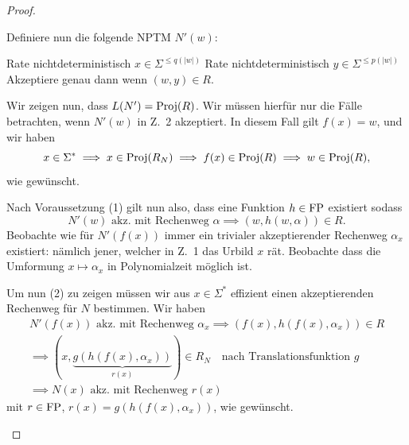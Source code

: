 \begin{proof}
\begin{prooflist}[label={}]
    Definiere nun die folgende NPTM $N'(w)$:\\
    \begin{algorithm}[H]
        Rate nichtdeterministisch $x\in \Sigma^{\leq q(|w|)}$\;
        Rate nichtdeterministisch $y\in \Sigma^{\leq p(|w|)}$\;
        Akzeptiere genau dann wenn $(w,y)\in R$.
    \end{algorithm}
    Wir zeigen nun, dass $L(N')=\operatorname{Proj}(R)$. Wir müssen hierfür nur die Fälle betrachten, wenn $N'(w)$ in Z.~2 akzeptiert.
    In diesem Fall gilt $f(x)=w$, und wir haben
    \[ x\in\Sigma^* \implies x\in\operatorname{Proj}(R_N) \implies f(x)\in\operatorname{Proj}(R) \implies w\in\operatorname{Proj}(R), \]
    wie gewünscht.

    Nach Voraussetzung (1) gilt nun also, dass eine Funktion $h\in\mathrm{FP}$ existiert sodass
    \[ N'(w) \text{ akz. mit Rechenweg $\alpha$} \implies (w,h(w,\alpha))\in R. \]
    Beobachte wie für $N'(f(x))$ immer ein trivialer akzeptierender Rechenweg $\alpha_x$ existiert: nämlich jener, welcher in Z.~1 das Urbild $x$ rät. Beobachte dass die Umformung $x\mapsto \alpha_x$ in Polynomialzeit möglich ist.

    Um nun (2) zu zeigen müssen wir aus $x\in\Sigma^*$ effizient einen akzeptierenden Rechenweg für $N$ bestimmen.
    Wir haben
    \begin{gather*}
        N'(f(x)) \text{ akz. mit Rechenweg $\alpha_x$} \implies (f(x),h(f(x),\alpha_x))\in R\\
        \implies (x, \underbrace{g(h(f(x), \alpha_x))}_{r(x)}) \in R_N \quad\text{nach Translationsfunktion $g$}\\
        \implies N(x) \text{ akz. mit Rechenweg } r(x)
    \end{gather*}
    mit $r\in \mathrm{FP}$, $r(x) = g(h(f(x), \alpha_x))$, wie gewünscht.
\end{prooflist}
\end{proof}


